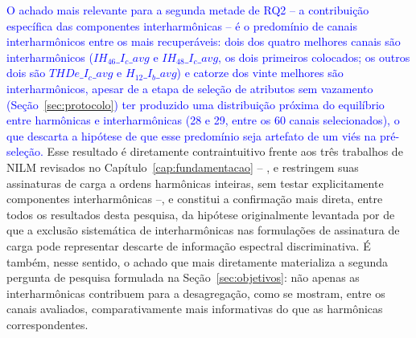 \documentclass[times,final]{elsarticle}
\begin{document}
\textcolor{blue}{O achado mais relevante para a segunda metade de RQ2 -- a contribuição específica das componentes interharmônicas -- é o predomínio de canais interharmônicos entre os mais recuperáveis: dois dos quatro melhores canais são interharmônicos ($IH_{46}\_I_c\_avg$ e $IH_{48}\_I_c\_avg$, os dois primeiros colocados; os outros dois são $THDe\_I_c\_avg$ e $H_{12}\_I_b\_avg$) e catorze dos vinte melhores são interharmônicos, apesar de a etapa de seleção de atributos sem vazamento (Seção~\ref{sec:protocolo}) ter produzido uma distribuição próxima do equilíbrio entre harmônicas e interharmônicas (28 e 29, entre os 60 canais selecionados), o que descarta a hipótese de que esse predomínio seja artefato de um viés na pré-seleção.} Esse resultado é diretamente contraintuitivo frente aos três trabalhos de NILM revisados no Capítulo~\ref{cap:fundamentacao} -- \citet{djordjevic2017}, \citet{bouhouras2017} e \citet{li2019moea} restringem suas assinaturas de carga a ordens harmônicas inteiras, sem testar explicitamente componentes interharmônicas --, e constitui a confirmação mais direta, entre todos os resultados desta pesquisa, da hipótese originalmente levantada por \citet{efe2016} de que a exclusão sistemática de interharmônicas nas formulações de assinatura de carga pode representar descarte de informação espectral discriminativa. É também, nesse sentido, o achado que mais diretamente materializa a segunda pergunta de pesquisa formulada na Seção~\ref{sec:objetivos}: não apenas as interharmônicas contribuem para a desagregação, como se mostram, entre os canais avaliados, comparativamente mais informativas do que as harmônicas correspondentes.
\end{document}
